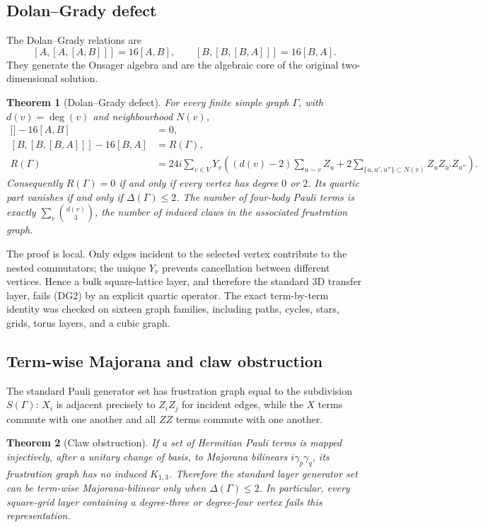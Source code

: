 \documentclass[11pt]{article}
\newtheorem{theorem}{Theorem}[section]
\begin{document}
\subsection{Dolan--Grady defect}
The Dolan--Grady relations are
\[
[A,[A,[A,B]]]=16[A,B],\qquad [B,[B,[B,A]]]=16[B,A].
\]
They generate the Onsager algebra and are the algebraic core of the original two-dimensional solution.

\begin{theorem}[Dolan--Grady defect]
For every finite simple graph $\Gamma$, with $d(v)=\deg(v)$ and neighbourhood $N(v)$,
\begin{align}
[A,[A,[A,B]]]-16[A,B]&=0,\\
[B,[B,[B,A]]]-16[B,A]&=R(\Gamma),\\
R(\Gamma)&=24i\sum_{v\in V}Y_v\left((d(v)-2)\sum_{u\sim v}Z_u
 +2\sum_{\{u,u',u''\}\subset N(v)}Z_uZ_{u'}Z_{u''}\right).
\end{align}
Consequently $R(\Gamma)=0$ if and only if every vertex has degree $0$ or $2$. Its quartic part vanishes if and only if $\Delta(\Gamma)\leq2$. The number of four-body Pauli terms is exactly $\sum_v\binom{d(v)}3$, the number of induced claws in the associated frustration graph.
\end{theorem}

The proof is local. Only edges incident to the selected vertex contribute to the nested commutators; the unique $Y_v$ prevents cancellation between different vertices. Hence a bulk square-lattice layer, and therefore the standard 3D transfer layer, fails (DG2) by an explicit quartic operator. The exact term-by-term identity was checked on sixteen graph families, including paths, cycles, stars, grids, torus layers, and a cubic graph.

\subsection{Term-wise Majorana and claw obstruction}
The standard Pauli generator set has frustration graph equal to the subdivision $S(\Gamma)$: $X_i$ is adjacent precisely to $Z_iZ_j$ for incident edges, while the $X$ terms commute with one another and all $ZZ$ terms commute with one another.

\begin{theorem}[Claw obstruction]
If a set of Hermitian Pauli terms is mapped injectively, after a unitary change of basis, to Majorana bilinears $i\gamma_p\gamma_q$, its frustration graph has no induced $K_{1,3}$. Therefore the standard layer generator set can be term-wise Majorana-bilinear only when $\Delta(\Gamma)\leq2$. In particular, every square-grid layer containing a degree-three or degree-four vertex fails this representation.
\end{theorem}
\end{document}

